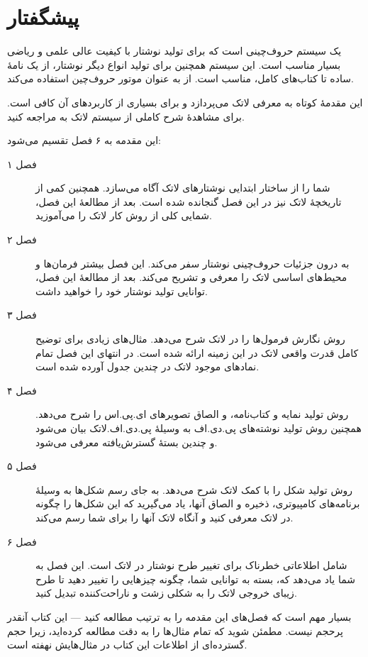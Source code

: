 \chapter{پیشگفتار}

\lr{\LaTeX{}} \cite{manual}
یک سیستم حروف‌چینی است که برای تولید نوشتار‌‌ با کیفیت عالی علمی و ریاضی بسیار مناسب است. این سیستم همچنین برای تولید انواع دیگر نوشتار‌‌، از یک نامهٔ ساده تا کتاب‌های کامل، مناسب است. 
\lr{\LaTeX}
از 
\lr{\TeX} \cite{texbook}
به عنوان موتور حروف‌چین استفاده می‌کند.

این مقدمهٔ کوتاه به معرفی لاتک می‌پردازد و برای بسیاری از کاربردهای آن کافی است. برای مشاهدهٔ شرح کاملی از سیستم لاتک به 
\cite{manual,companion}
مراجعه کنید.

\bigskip
\noindent 
این مقدمه به ۶ فصل تقسیم می‌شود:
\begin{description}
\item[فصل ۱] 
شما را از ساختار ابتدایی نوشتارهای لاتک آگاه می‌سازد. همچنین کمی از تاریخچهٔ لاتک نیز در این فصل گنجانده شده است. بعد از مطالعهٔ این فصل، شمایی کلی از روش کار لاتک را می‌آموزید.
\item[فصل ۲] 
به درون جزئیات حروف‌چینی نوشتار سفر می‌کند. این فصل بیشتر فرمان‌ها و محیط‌های اساسی لاتک را معرفی و تشریح می‌کند. بعد از مطالعهٔ این فصل، توانایی تولید نوشتار خود را خواهید داشت.
\item[فصل ۳]
روش نگارش فرمول‌ها را در لاتک شرح می‌دهد. مثال‌های زیادی برای توضیح کامل قدرت واقعی لاتک در این زمینه ارائه شده است. در انتهای این فصل تمام نمادهای موجود لاتک  در چندین جدول آورده شده است.
\item[فصل ۴] 
روش تولید نمایه و کتاب‌نامه، و الصاق تصویر‌های ای.پی.اس را شرح می‌دهد. همچنین روش تولید نوشته‌های پی.دی.اف به وسیلهٔ پی.دی.اف.لاتک بیان می‌شود و چندین بستهٔ گسترش‌یافته معرفی می‌شود. 
\item[فصل ۵] 
روش تولید شکل‌ را با کمک لاتک شرح می‌دهد. به جای رسم شکل‌ها به وسیلهٔ برنامه‌های کامپیوتری، ذخیره و الصاق آنها، یاد می‌گیرید که این شکل‌ها را چگونه در لاتک معرفی کنید و آنگاه لاتک آنها را برای شما رسم می‌کند.
\item[فصل ۶] 
شامل اطلاعاتی خطرناک برای تغییر طرح نوشتار در لاتک است. این فصل به شما یاد می‌دهد که، بسته به توانایی شما، چگونه چیز‌هایی را تغییر دهید تا طرح زیبای خروجی لاتک را به شکلی زشت و ناراحت‌کننده تبدیل کنید.
\end{description}
\bigskip
\noindent 
بسیار مهم است که فصل‌های این مقدمه را به ترتیب مطالعه کنید --- این کتاب آنقدر پرحجم نیست. مطمئن شوید که تمام مثال‌ها را به دقت مطالعه کرده‌اید، زیرا حجم گسترده‌ای از اطلاعات این کتاب در مثال‌هایش نهفته است.

